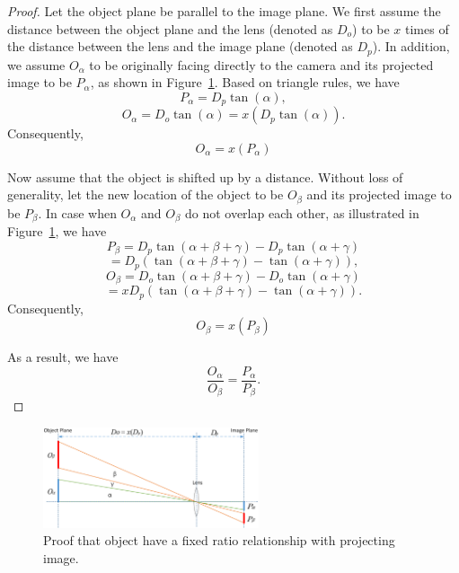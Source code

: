 \begin{proof}
   Let the object plane be parallel to the image plane. We first assume the distance between the object plane and the lens (denoted as $D_o$) to be $x$ times of the distance between the lens and the image plane (denoted as $D_p$). In addition, we assume $O_\alpha$ to be originally facing directly to the camera and its projected image to be $P_\alpha$, as shown in Figure~\ref{fig-proof-projection}.
   Based on triangle rules, we have
    \[P_\alpha=D_p\tan(\alpha),\]
    \[O_\alpha=D_o\tan(\alpha)=x(D_p\tan(\alpha)).\] Consequently,
    \[O_\alpha=x(P_\alpha)\]

   Now assume that the object is shifted up by a distance. Without loss of generality, let the new location of the object to be $O_\beta$ and its projected image to be $P_\beta$.
   In case when $O_\alpha$ and $O_\beta$ do not overlap each other, as illustrated in Figure~\ref{fig-proof-projection}, we have
    \[P_\beta=D_p\tan(\alpha+\beta+\gamma)-D_p\tan(\alpha+\gamma)\]
    \[=D_p(\tan(\alpha+\beta+\gamma)-\tan(\alpha+\gamma)),\]
    \[O_\beta=D_o\tan(\alpha+\beta+\gamma)-D_o\tan(\alpha+\gamma)\]
    \[=xD_p(\tan(\alpha+\beta+\gamma)-\tan(\alpha+\gamma)).\] Consequently,
    \[O_\beta=x(P_\beta)\]

    As a result, we have
    \[\frac{O_\alpha}{O_\beta}=\frac{P_\alpha}{P_\beta}.\]
\end{proof}
\begin{figure}
  \vspace{-20pt}
  \begin{center}
    \includegraphics[width=2.5in]{fig/fig-proof-projection.eps}
  \end{center}
  \vspace{-20pt}
  \caption{Proof that object have a fixed ratio relationship with projecting image.}\label{fig-proof-projection}
  \vspace{-20pt}
\end{figure}

